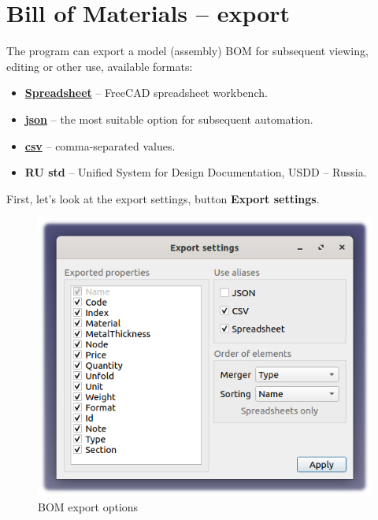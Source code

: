 \documentclass[a4paper,12pt]{article}
\begin{document}
\section{Bill of Materials -- export}

The program can export a model (assembly) BOM for subsequent viewing, editing or other use, available formats:
\begin{itemize}
	\item \href{https://wiki.freecad.org/Spreadsheet_Workbench}{\textbf{Spreadsheet}} -- FreeCAD spreadsheet workbench.
	\item \href{https://ru.wikipedia.org/wiki/JSON}{\textbf{json}} -- the most suitable option for subsequent automation.
	\item \href{https://en.wikipedia.org/wiki/Comma-separated_values}{\textbf{csv}} -- comma-separated values.
	\item \textbf{RU std} -- Unified System for Design Documentation, USDD -- Russia.
\end{itemize}

\begin{flushleft}First, let's look at the export settings, button \textbf{Export settings}.\end{flushleft}

\begin{figure}[htp]
	\centering
	\includegraphics[scale=1]{img/bom_export.png}
	\caption{BOM export options}
	\label{sec:bom_export}
\end{figure}
\end{document}
